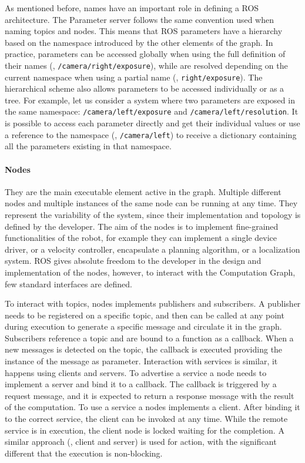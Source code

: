 As mentioned before, names have an important role in defining a ROS architecture. The Parameter server follows the same convention used when naming topics and nodes. This means that ROS parameters have a hierarchy based on the namespace introduced by the other elements of the graph. In practice, parameters can be accessed globally when using the full definition of their names (\eg, \texttt{/camera/right/exposure}), while are resolved depending on the current namespace when using a partial name (\eg, \texttt{right/exposure}). The hierarchical scheme also allows parameters to be accessed individually or as a tree. For example, let us consider a system where two parameters are exposed in the same namespace: \texttt{/camera/left/exposure} and \texttt{/camera/left/resolution}. It is possible to access each parameter directly and get their individual values or use a reference to the namespace (\ie, \texttt{/camera/left}) to receive a dictionary containing all the parameters existing in that namespace.

\paragraph{Nodes} They are the main executable element active in the graph. Multiple different nodes and multiple instances of the same node can be running at any time. They represent the variability of the system, since their implementation and topology is defined by the developer. The aim of the nodes is to implement fine-grained functionalities of the robot, for example they can implement a single device driver, or a velocity controller, encapsulate a planning algorithm, or a localization system. ROS gives absolute freedom to the developer in the design and implementation of the nodes, however, to interact with the Computation Graph, few standard interfaces are defined.

To interact with topics, nodes implements publishers and subscribers. A publisher needs to be registered on a specific topic, and then can be called at any point during execution to generate a specific message and circulate it in the graph. Subscribers reference a topic and are bound to a function as a callback. When a new messages is detected on the topic, the callback is executed providing the instance of the message as parameter. Interaction with services is similar, it happens using clients and servers. To advertise a service a node needs to implement a server and bind it to a callback. The callback is triggered by a request message, and it is expected to return a response message with the result of the computation. To use a service a nodes implements a client. After binding it to the correct service, the client can be invoked at any time. While the remote service is in execution, the client node is locked waiting for the completion. A similar approach (\ie, client and server) is used for action, with the significant different that the execution is non-blocking.

